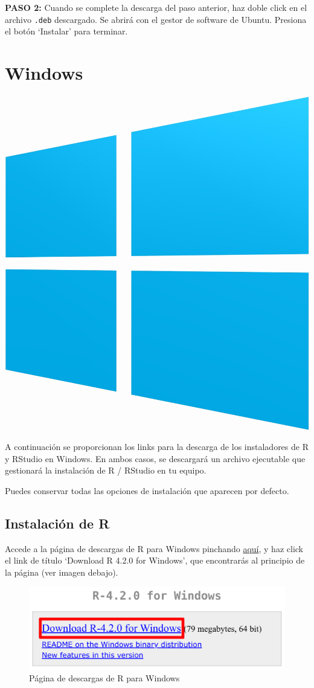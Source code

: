 \documentclass[
  title=normal,
  notoc,
  bib=normal]{mnye}
\newcommand{\passthrough}[1]{#1}
\begin{document}
\textbf{PASO 2: }
Cuando se complete la descarga del paso anterior, haz doble click en el archivo \passthrough{\lstinline!.deb!} descargado. Se abrirá con el gestor de software de Ubuntu. Presiona el botón `Instalar' para terminar.

\hypertarget{windows}{%
\section{Windows}\label{windows}}

\begin{center}\includegraphics[width=0.15\linewidth]{images/os/windows} \end{center}

A continuación se proporcionan los links para la descarga de los instaladores de R y RStudio en Windows. En ambos casos, se descargará un archivo ejecutable que gestionará la instalación de R / RStudio en tu equipo.

Puedes conservar todas las opciones de instalación que aparecen por defecto.

\hypertarget{instalaciuxf3n-de-r-1}{%
\subsection{Instalación de R}\label{instalaciuxf3n-de-r-1}}

Accede a la página de descargas de R para Windows pinchando \href{https://cloud.r-project.org/bin/windows/base/}{aquí}, y haz click el link de título `Download R 4.2.0 for Windows', que encontrarás al principio de la página (ver imagen debajo).

\begin{figure}

{\centering \includegraphics[width=0.65\linewidth]{images/r-windows} 

}

\caption{Página de descargas de R para Windows}\label{fig:unnamed-chunk-12}
\end{figure}
\end{document}

